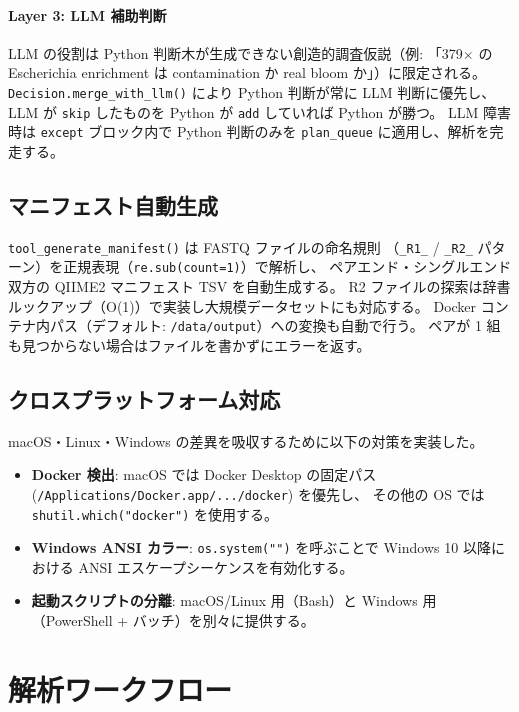 \documentclass[12pt, a4paper]{article}
\begin{document}
\paragraph{Layer 3: LLM 補助判断}
LLM の役割は Python 判断木が生成できない創造的調査仮説（例: 「379$\times$ の Escherichia enrichment は contamination か real bloom か」）に限定される。
\texttt{Decision.merge\_with\_llm()} により Python 判断が常に LLM 判断に優先し、
LLM が \texttt{skip} したものを Python が \texttt{add} していれば Python が勝つ。
LLM 障害時は \texttt{except} ブロック内で Python 判断のみを \texttt{plan\_queue} に適用し、解析を完走する。

\subsection{マニフェスト自動生成}

\texttt{tool\_generate\_manifest()} は FASTQ ファイルの命名規則
（\texttt{\_R1\_} / \texttt{\_R2\_} パターン）を正規表現（\texttt{re.sub(count=1)}）で解析し、
ペアエンド・シングルエンド双方の QIIME2 マニフェスト TSV を自動生成する。
R2 ファイルの探索は辞書ルックアップ（O(1)）で実装し大規模データセットにも対応する。
Docker コンテナ内パス（デフォルト: \texttt{/data/output}）への変換も自動で行う。
ペアが 1 組も見つからない場合はファイルを書かずにエラーを返す。

\subsection{クロスプラットフォーム対応}

macOS・Linux・Windows の差異を吸収するために以下の対策を実装した。

\begin{itemize}
  \item \textbf{Docker 検出}:
    macOS では Docker Desktop の固定パス
    (\texttt{/Applications/Docker.app/.../docker}) を優先し、
    その他の OS では \texttt{shutil.which("docker")} を使用する。
  \item \textbf{Windows ANSI カラー}:
    \texttt{os.system("")} を呼ぶことで Windows 10 以降における
    ANSI エスケープシーケンスを有効化する。
  \item \textbf{起動スクリプトの分離}:
    macOS/Linux 用（Bash）と Windows 用（PowerShell + バッチ）を別々に提供する。
\end{itemize}

\section{解析ワークフロー}
\end{document}
